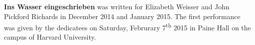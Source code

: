 \textbf{Ins Wasser eingeschrieben} was written for Elizabeth Weisser and John
Pickford Richards in December 2014 and January 2015. The first performance was
given by the dedicatees on Saturday, Februrary 7\textsuperscript{th} 2015 in
Paine Hall on the campus of Harvard University.
